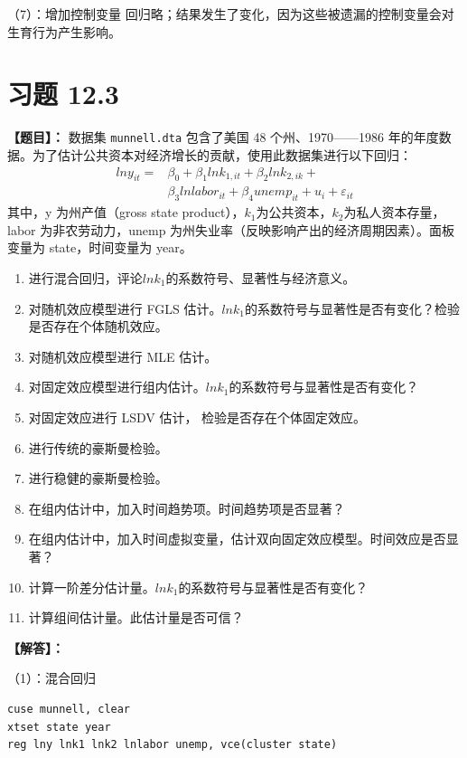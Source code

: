 \documentclass[cn,fancy,blue,11pt]{elegantbook}
\begin{document}
（7）：增加控制变量
回归略；结果发生了变化，因为这些被遗漏的控制变量会对生育行为产生影响。

\hypertarget{section-52}{%
\section{习题 12.3}\label{section-52}}

\textbf{【题目】：}
数据集 \lstinline{munnell.dta} 包含了美国 48 个州、1970------1986 年的年度数据。为了估计公共资本对经济增长的贡献，使用此数据集进行以下回归：
\begin{align}
lny_{it} = & \beta_0 + \beta_1lnk_{1, it} + \beta_2lnk_{2, ik} + \\
& \beta_3lnlabor_{it} + \beta_4unemp_{it} + u_{i} + \varepsilon_{it}
\end{align}
其中，y 为州产值（gross state product），\(k_1\)为公共资本，\(k_2\)为私人资本存量，labor 为非农劳动力，unemp 为州失业率（反映影响产出的经济周期因素）。面板变量为 state，时间变量为 year。
\begin{enumerate}
  \item 进行混合回归，评论\(lnk_1\)的系数符号、显著性与经济意义。
  \item 对随机效应模型进行 FGLS 估计。\(lnk_1\)的系数符号与显著性是否有变化？检验是否存在个体随机效应。
  \item 对随机效应模型进行 MLE 估计。
  \item 对固定效应模型进行组内估计。\(lnk_1\)的系数符号与显著性是否有变化？
  \item 对固定效应进行 LSDV 估计， 检验是否存在个体固定效应。
  \item 进行传统的豪斯曼检验。
  \item 进行稳健的豪斯曼检验。
  \item 在组内估计中，加入时间趋势项。时间趋势项是否显著？
  \item 在组内估计中，加入时间虚拟变量，估计双向固定效应模型。时间效应是否显著？
  \item 计算一阶差分估计量。\(lnk_1\)的系数符号与显著性是否有变化？
  \item 计算组间估计量。此估计量是否可信？
\end{enumerate}

\textbf{【解答】：}

（1）：混合回归

\begin{lstlisting}
cuse munnell, clear
xtset state year
reg lny lnk1 lnk2 lnlabor unemp, vce(cluster state)
\end{lstlisting}
\end{document}
